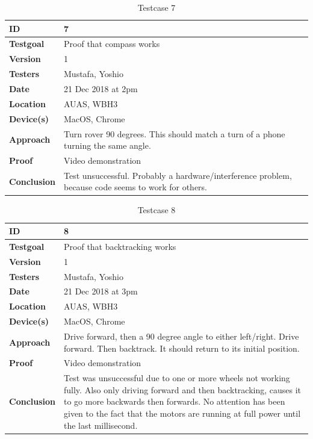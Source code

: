 \documentclass[12pt]{article}
\begin{document}
	\begin{table}[H]
		\centering
		\begin{tabularx}{\linewidth}{|X|X|}
			\hline
			\textbf{ID} &7\\
			\hline
			\textbf{Testgoal} &Proof that compass works\\
			\hline
			\textbf{Version} &1\\
			\hline
			\textbf{Testers} &Mustafa, Yoshio\\
			\hline
			\textbf{Date} &21 Dec 2018 at 2pm\\
			\hline
			\textbf{Location} &AUAS, WBH3\\
			\hline
			\textbf{Device(s)} &MacOS, Chrome\\
			\hline
			\textbf{Approach} &Turn rover 90 degrees. This should match a turn of a phone turning the same angle.\\
			\hline
			\textbf{Proof} &Video demonstration\\
			\hline
			\textbf{Conclusion} &Test unsuccessful. Probably a hardware/interference problem, because code seems to work for others.\\
			\hline
		\end{tabularx}
		\caption{Testcase 7}
		\label{table:Testcase 7}   
	\end{table}
	\begin{table}[H]
		\centering
		\begin{tabularx}{\linewidth}{|X|X|}
			\hline
			\textbf{ID} &8\\
			\hline
			\textbf{Testgoal} &Proof that backtracking works\\
			\hline
			\textbf{Version} &1\\
			\hline
			\textbf{Testers} &Mustafa, Yoshio\\
			\hline
			\textbf{Date} &21 Dec 2018 at 3pm\\
			\hline
			\textbf{Location} &AUAS, WBH3\\
			\hline
			\textbf{Device(s)} &MacOS, Chrome\\
			\hline
			\textbf{Approach} &Drive forward, then a 90 degree angle to either left/right. Drive forward. Then backtrack. It should return to its initial position.\\
			\hline
			\textbf{Proof} &Video demonstration\\
			\hline
			\textbf{Conclusion} &Test was unsuccessful due to one or more wheels not working fully. Also only driving forward and then backtracking, causes it to go more backwards then forwards. No attention has been given to the fact that the motors are running at full power until the last millisecond.\\
			\hline
		\end{tabularx}
		\caption{Testcase 8}
		\label{table:Testcase 8}   
	\end{table}
\end{document}
